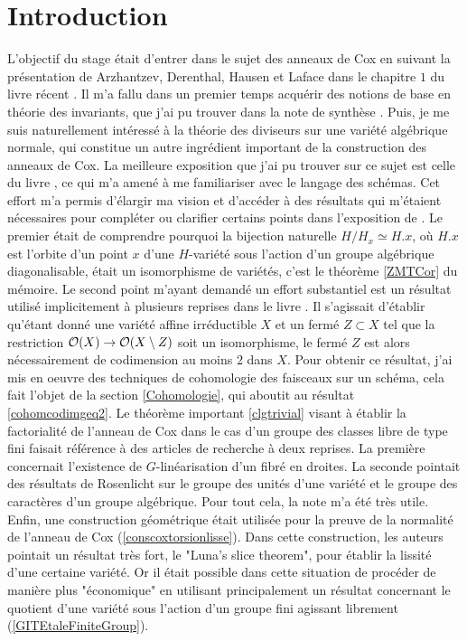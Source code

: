 
\section*{Introduction}

L'objectif du stage était d'entrer dans le sujet des anneaux de Cox en suivant la présentation de Arzhantzev, Derenthal, Hausen et Laface dans le chapitre $1$ du livre récent \cite{coxrings}. Il m'a fallu dans un premier temps acquérir des notions de base en théorie des invariants, que j'ai pu trouver dans la note de synthèse \cite{LAGBrion}. Puis, je me suis naturellement intéressé à la théorie des diviseurs sur une variété algébrique normale, qui constitue un autre ingrédient important de la construction des anneaux de Cox. La meilleure exposition que j'ai pu trouver sur ce sujet est celle du livre \cite{Hartshorne}, ce qui m'a amené à me familiariser avec le langage des schémas. Cet effort m'a permis d'élargir ma vision et d'accéder à des résultats qui m'étaient nécessaires pour compléter ou clarifier certains points dans l'exposition de \cite{coxrings}. Le premier était de comprendre pourquoi la bijection naturelle $H/H_x\simeq H.x$, où $H.x$ est l'orbite d'un point $x$ d'une $H$-variété sous l'action d'un groupe algébrique diagonalisable, était un isomorphisme de variétés, c'est le théorème \ref{ZMTCor} du mémoire. Le second point m'ayant demandé un effort substantiel est un résultat utilisé implicitement à plusieurs reprises dans le livre \cite{coxrings}. Il s'agissait d'établir qu'étant donné une variété affine irréductible $X$ et un fermé $Z\subset X$ tel que la restriction $\mathcal{O}(X)\rightarrow \mathcal{O}(X\setminus Z)$ soit un isomorphisme, le fermé $Z$ est alors nécessairement de codimension au moins $2$ dans $X$. Pour obtenir ce résultat, j'ai mis en oeuvre des techniques de cohomologie des faisceaux sur un schéma, cela fait l'objet de la section \ref{Cohomologie}, qui aboutit au résultat \ref{cohomcodimgeq2}. Le théorème important \ref{clgtrivial} visant à établir la factorialité de l'anneau de Cox dans le cas d'un groupe des classes libre de type fini  faisait référence à des articles de recherche à deux reprises. La première concernait l'existence de $G$-linéarisation d'un fibré en droites. La seconde pointait des résultats de Rosenlicht sur le groupe des unités d'une variété et le groupe des caractères d'un groupe algébrique. Pour tout cela, la note \cite{LinearizationGBrion} m'a été très utile. Enfin, une construction géométrique était utilisée pour la preuve de la normalité de l'anneau de Cox (\ref{conscoxtorsionlisse}). Dans cette construction, les auteurs pointait un résultat très fort, le "Luna's slice theorem", pour établir la lissité d'une certaine variété. Or il était possible dans cette situation de procéder de manière plus "économique" en utilisant principalement un résultat concernant le quotient d'une variété sous l'action d'un groupe fini agissant librement (\ref{GITEtaleFiniteGroup}).

